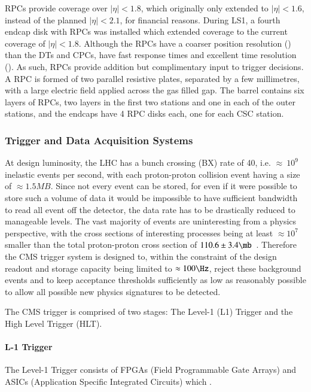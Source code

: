 RPCs provide coverage over $|\eta| < 1.8$, which originally only extended to $|\eta| < 1.6$, instead of the planned $|\eta| < 2.1$, for financial reasons. 
During LS1, a fourth endcap disk with RPCs was installed which extended coverage to the current coverage of $|\eta| < 1.8$\cite{Battilana:2017mrm}.
Although the RPCs have a coarser position resolution (\cm) than the DTs and CPCs, have fast response times and excellent time resolution (\ns).
As such, RPCs provide addition but complimentary input to trigger decisions.
A RPC is formed of two parallel resistive plates, separated by a few millimetres, with a large electric field applied across the gas filled gap.
The barrel contains six layers of RPCs, two layers in the first two stations and one in each of the outer stations, and the endcaps have 4 RPC disks each, one for each CSC station.

\subsubsection{Trigger and Data Acquisition Systems}\label{subsubsec:trigger}
At design luminosity, the LHC has a bunch crossing (BX) rate of 40\MHz, i.e. $\approx~10^{9}$ inelastic events per second, with each proton-proton collision event having a size of $\approx 1.5MB$.
Since not every event can be stored, for even if it were possible to store such a volume of data it would be impossible to have sufficient bandwidth to read all event off the detector, the data rate has to be drastically reduced to manageable levels.
The vast majority of events are uninteresting from a physics perspective, with the cross sections of interesting processes being at least $\approx 10^{7}$ smaller than the total proton-proton cross section of $110.6 \pm3.4\mb$~\cite{Antchev:2017dia}.
Therefore the CMS trigger system is designed to, within the constraint of the design readout and storage capacity being limited to $\approx 100\Hz$, reject these background events and to keep acceptance thresholds sufficiently as low as reasonably possible to allow all possible new physics signatures to be detected.

The CMS trigger is comprised of two stages: The Level-1 (L1) Trigger and the High Level Trigger (HLT).

\paragraph{L-1 Trigger}\label{paragraph:L1}
The Level-1 Trigger consists of FPGAs (Field Programmable Gate Arrays) and ASICs (Application Specific Integrated Circuits) which .


